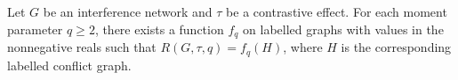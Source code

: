 Let \(G\) be an interference network and \(\tau\) be a contrastive effect. For each moment parameter \(q\geq2\), there exists a function \(f_q\) on labelled graphs with values in the nonnegative reals such that \(R(G,\tau,q)=f_q(H)\), where \(H\) is the corresponding labelled conflict graph.